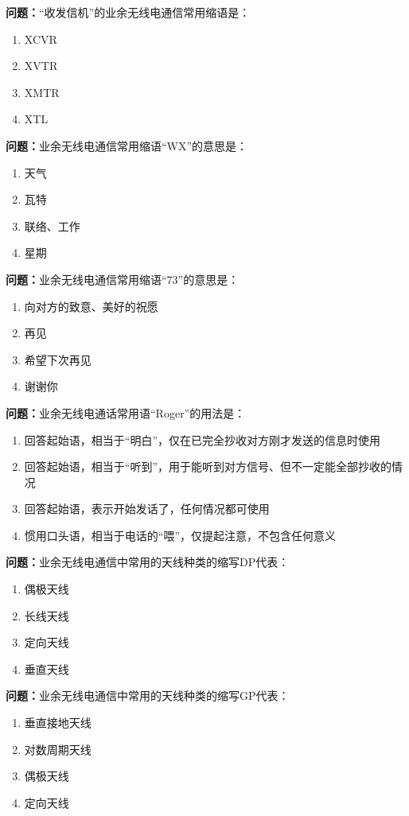 \documentclass{ctexbook}
\begin{document}
\textbf{问题：}“收发信机”的业余无线电通信常用缩语是：
\begin{enumerate}[label=\Alph*), leftmargin=3em]
\item XCVR
\item XVTR
\item XMTR
\item XTL
\end{enumerate}

\textbf{问题：}业余无线电通信常用缩语“WX”的意思是：
\begin{enumerate}[label=\Alph*), leftmargin=3em]
\item 天气
\item 瓦特
\item 联络、工作
\item 星期
\end{enumerate}

\textbf{问题：}业余无线电通信常用缩语“73”的意思是：
\begin{enumerate}[label=\Alph*), leftmargin=3em]
\item 向对方的致意、美好的祝愿
\item 再见
\item 希望下次再见
\item 谢谢你
\end{enumerate}

\textbf{问题：}业余无线电通话常用语“Roger”的用法是：
\begin{enumerate}[label=\Alph*), leftmargin=3em]
\item 回答起始语，相当于“明白”，仅在已完全抄收对方刚才发送的信息时使用
\item 回答起始语，相当于“听到”，用于能听到对方信号、但不一定能全部抄收的情况
\item 回答起始语，表示开始发话了，任何情况都可使用
\item 惯用口头语，相当于电话的“喂”，仅提起注意，不包含任何意义
\end{enumerate}

\textbf{问题：}业余无线电通信中常用的天线种类的缩写DP代表：
\begin{enumerate}[label=\Alph*), leftmargin=3em]
\item 偶极天线
\item 长线天线
\item 定向天线
\item 垂直天线
\end{enumerate}

\textbf{问题：}业余无线电通信中常用的天线种类的缩写GP代表：
\begin{enumerate}[label=\Alph*), leftmargin=3em]
\item 垂直接地天线
\item 对数周期天线
\item 偶极天线
\item 定向天线
\end{enumerate}
\end{document}

